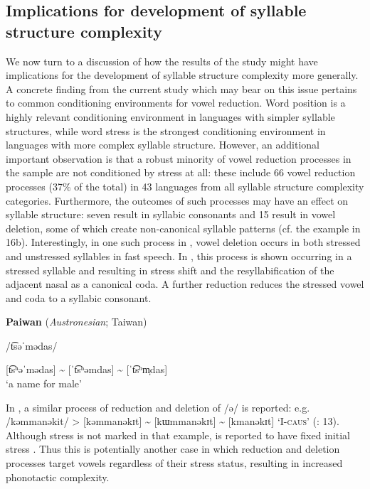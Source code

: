 \subsection{Implications for development of syllable structure complexity}\label{sec:6.4.2}

  We now turn to a discussion of how the results of the study might have implications for the development of syllable structure complexity more generally. A concrete finding from the current study which may bear on this issue pertains to common conditioning environments for vowel reduction. Word position is a highly relevant conditioning environment in languages with simpler syllable structures, while word stress is the strongest conditioning environment in languages with more complex syllable structure. However, an additional important observation is that a robust minority of vowel reduction processes in the sample are not conditioned by stress at all: these include 66 vowel reduction processes (37\% of the total) in 43 languages from all syllable structure complexity categories. Furthermore, the outcomes of such processes may have an effect on syllable structure: seven result in syllabic consonants and 15 result in vowel deletion, some of which create non-canonical syllable patterns (cf. the  example in 16b). Interestingly, in one such process in , vowel deletion occurs in both stressed and unstressed syllables in fast speech. In , this process is shown occurring in a stressed syllable and resulting in stress shift and the resyllabification of the adjacent nasal as a canonical coda. A further reduction reduces the stressed vowel and coda to a syllabic consonant.

\ea\label{ex:6.21}
  \textbf{Paiwan} (\textit{Austronesian}; Taiwan)

/t͡səˈmədas/

[t͡sʰəˈmədas] {\textasciitilde} [ˈt͡sʰəmdas] {\textasciitilde} [ˈt͡sʰm̩das]\\
\glt ‘a name for male’
\citep[42]{Chang2006}
\z

In , a similar process of reduction and deletion of /ə/ is reported: e.g. /kəmmanəkit/ > [kəmmanəkɪt] {\textasciitilde} [kɯmmanəkɪt] {\textasciitilde} [kmanəkɪt] ‘I-\textsc{caus}’ (\citealt{GeorgVolodin1999}: 13). Although stress is not marked in that example,  is reported to have fixed initial stress \citep[6]{Bobaljik2006}. Thus this is potentially another case in which reduction and deletion processes target vowels regardless of their stress status, resulting in increased phonotactic complexity. 

